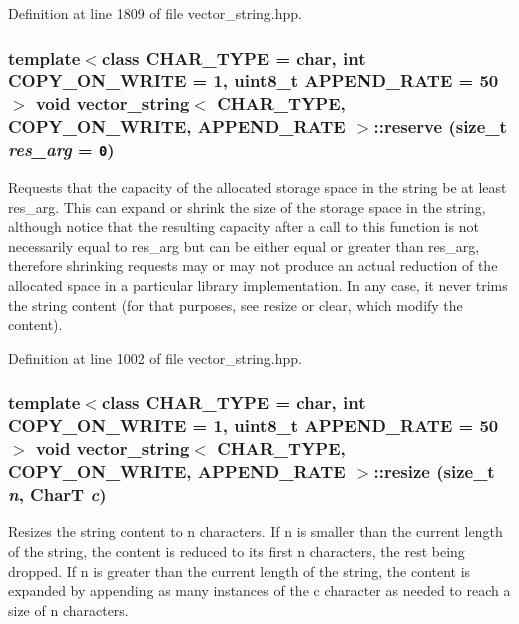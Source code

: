 Definition at line 1809 of file vector\_\-string.hpp.\hypertarget{classvector__string_6499804dfd9b47e4fd747ccd982c20eb}{
\subsubsection[{reserve}]{\setlength{\rightskip}{0pt plus 5cm}template$<$class CHAR\_\-TYPE  = char, int COPY\_\-ON\_\-WRITE = 1, uint8\_\-t APPEND\_\-RATE = 50$>$ void {\bf vector\_\-string}$<$ CHAR\_\-TYPE, COPY\_\-ON\_\-WRITE, APPEND\_\-RATE $>$::reserve (size\_\-t {\em res\_\-arg} = {\tt 0})}}
\label{classvector__string_6499804dfd9b47e4fd747ccd982c20eb}


Requests that the capacity of the allocated storage space in the string be at least res\_\-arg. This can expand or shrink the size of the storage space in the string, although notice that the resulting capacity after a call to this function is not necessarily equal to res\_\-arg but can be either equal or greater than res\_\-arg, therefore shrinking requests may or may not produce an actual reduction of the allocated space in a particular library implementation. In any case, it never trims the string content (for that purposes, see resize or clear, which modify the content). 

Definition at line 1002 of file vector\_\-string.hpp.\hypertarget{classvector__string_dd247a6af30053ac812a485ba12d9369}{
\subsubsection[{resize}]{\setlength{\rightskip}{0pt plus 5cm}template$<$class CHAR\_\-TYPE  = char, int COPY\_\-ON\_\-WRITE = 1, uint8\_\-t APPEND\_\-RATE = 50$>$ void {\bf vector\_\-string}$<$ CHAR\_\-TYPE, COPY\_\-ON\_\-WRITE, APPEND\_\-RATE $>$::resize (size\_\-t {\em n}, \/  CharT {\em c})}}
\label{classvector__string_dd247a6af30053ac812a485ba12d9369}


Resizes the string content to n characters. If n is smaller than the current length of the string, the content is reduced to its first n characters, the rest being dropped. If n is greater than the current length of the string, the content is expanded by appending as many instances of the c character as needed to reach a size of n characters.

